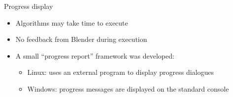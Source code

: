 \documentclass{beamer}
\begin{document}
\begin{frame}
    \begin{block}{Progress display}
	\begin{itemize}
	\item Algorithms may take time to execute
	\item No feedback from Blender during execution
	\item A small “progress report” framework was developed:
	\begin{itemize}
		\item Linux: uses an external program to display progress dialogues
		\item Windows: progress messages are displayed on the standard console
	\end{itemize}
	\end{itemize}
    \end{block}
\end{frame}
\end{document}
